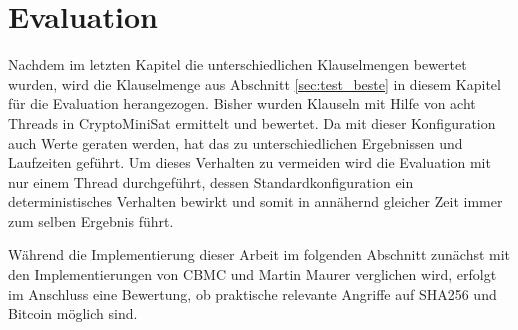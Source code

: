 \chapter{Evaluation}
\label{chp:evaluation}

Nachdem im letzten Kapitel die unterschiedlichen Klauselmengen bewertet wurden, wird die Klauselmenge aus Abschnitt \ref{sec:test_beste}
in diesem Kapitel für die Evaluation herangezogen. Bisher wurden Klauseln mit Hilfe von acht Threads in CryptoMiniSat ermittelt und bewertet.
Da mit dieser Konfiguration auch Werte geraten werden, hat das zu unterschiedlichen Ergebnissen und Laufzeiten geführt. Um dieses Verhalten
zu vermeiden wird die Evaluation mit nur einem Thread durchgeführt, dessen Standardkonfiguration ein deterministisches Verhalten bewirkt
und somit in annähernd gleicher Zeit immer zum selben Ergebnis führt.

Während die Implementierung dieser Arbeit im folgenden Abschnitt zunächst mit den Implementierungen von CBMC und Martin Maurer verglichen wird,
erfolgt im Anschluss eine Bewertung, ob praktische relevante Angriffe auf SHA256 und Bitcoin möglich sind.



